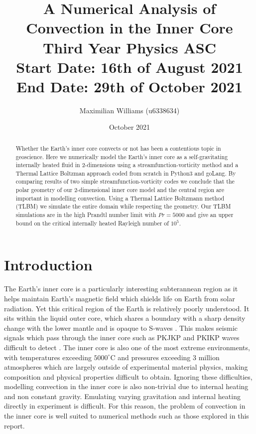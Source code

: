 \documentclass{article}
\title{%
  A Numerical Analysis of Convection in the Inner Core \\
  \large Third Year Physics ASC  \\
    Start Date: 16th of August 2021 End Date: 29th of October 2021}
\author{Maximilian Williams (u6338634)}
\date{October 2021}
\begin{document}
\maketitle

\begin{abstract}

	\noindent Whether the Earth's inner core convects or not has been a contentious topic 
	in geoscience. Here we numerically model the Earth's inner core as a self-gravitating 
	internally heated fluid 
	in 2-dimensions using a streamfunction-vorticity method and a Thermal Lattice Boltzman 
	approach coded from scratch in Python3 and goLang. By 
	comparing results of two simple 
	streamfunction-vorticity codes we conclude that the polar geometry of our 2-dimensional
	inner core model and the central region are important in 
	modelling convection. Using a Thermal Lattice Boltzmann method (TLBM) we simulate the 
	entire domain while respecting the geometry. Our TLBM simulations are in the high 
	Prandtl number limit with $Pr=5000$ and give an upper bound on the critical internally 
	heated Rayleigh number of $10^5$. 
 
\end{abstract}

\section*{Introduction}


The Earth's inner core is a particularly interesting subterannean  region as it helps maintain Earth's magnetic field which shields life on Earth from
solar 
radiation. Yet this critical region of the Earth is relatively poorly understood. It sits within the liquid outer core, which shares a boundary with a sharp 
density change with the lower mantle and is opaque to S-waves \cite{fowler1990solid}. This makes seismic signals which pass through the inner core such 
as PKJKP and PKIKP waves difficult to detect \cite{tkalvcic2018shear, bolt1970pdp} . The inner core is also one of the most extreme environments, with 
temperatures exceeding $5000^{\circ}$C and pressures exceeding 3 million atmospheres which are 
largely outside of experimental material physics, making composition and physical properties difficult to obtain. Ignoring these difficulties, modelling 
convection in the inner core is also non-trivial due to internal heating and non constant gravity. Emulating varying gravitation and internal heating 
directly in experiment is difficult. For this reason, the problem of convection in the inner core is well suited to numerical methods such as those 
explored in this report.
\end{document}
